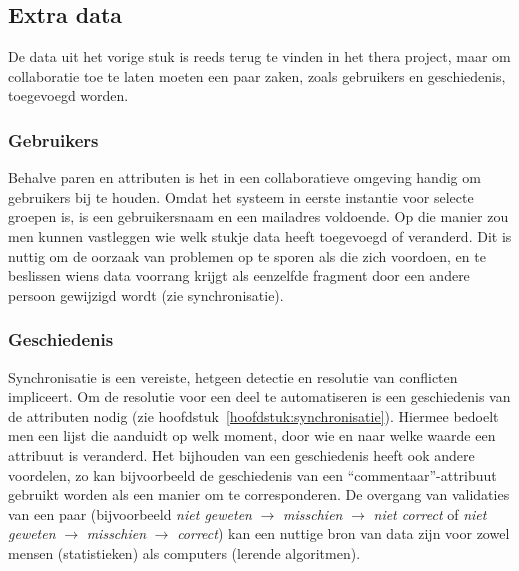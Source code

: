 \subsection{Extra data}
De data uit het vorige stuk is reeds terug te vinden in het thera project, maar om collaboratie toe te laten moeten een paar zaken, zoals gebruikers en geschiedenis, toegevoegd worden.

\subsubsection{Gebruikers}
Behalve paren en attributen is het in een collaboratieve omgeving handig om gebruikers bij te houden. Omdat het systeem in eerste instantie voor selecte groepen is, is een gebruikersnaam en een mailadres voldoende. Op die manier zou men kunnen vastleggen wie welk stukje data heeft toegevoegd of veranderd. Dit is nuttig om de oorzaak van problemen op te sporen als die zich voordoen, en te beslissen wiens data voorrang krijgt als eenzelfde fragment door een andere persoon gewijzigd wordt (zie synchronisatie).

\subsubsection{Geschiedenis}
Synchronisatie is een vereiste, hetgeen detectie en resolutie van conflicten impliceert. Om de resolutie voor een deel te automatiseren is een geschiedenis van de attributen nodig (zie hoofdstuk~\ref{hoofdstuk:synchronisatie}). Hiermee bedoelt men een lijst die aanduidt op welk moment, door wie en naar welke waarde een attribuut is veranderd. Het bijhouden van een geschiedenis heeft ook andere voordelen, zo kan bijvoorbeeld de geschiedenis van een ``commentaar''-attribuut gebruikt worden als een manier om te corresponderen. De overgang van validaties van een paar (bijvoorbeeld \emph{niet geweten} $\rightarrow$ \emph{misschien} $\rightarrow$ \emph{niet correct} of  \emph{niet geweten} $\rightarrow$ \emph{misschien} $\rightarrow$ \emph{correct}) kan een nuttige bron van data zijn voor zowel mensen (statistieken) als computers (lerende algoritmen).
  

